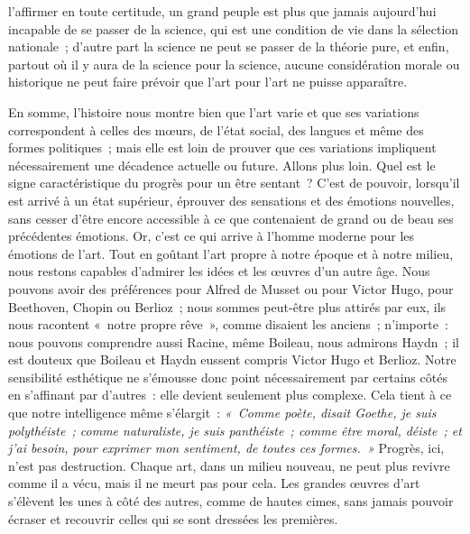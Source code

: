 \documentclass[french,twoside]{book} %
\begin{document}
l’affirmer en toute certitude, un grand peuple est plus que jamais aujourd’hui incapable de se passer de la science, qui est une condition de vie dans la sélection nationale ; d’autre part la science ne peut se passer de la théorie pure, et enfin, partout où il y aura de la science pour la science, aucune considération morale ou historique ne peut faire prévoir que l’art pour l’art ne puisse apparaître.\par
\par
En somme, l’histoire nous montre bien que l’art varie et que ses variations correspondent à celles des mœurs, de l’état social, des langues et même des formes politiques ; mais elle est loin de prouver que ces variations impliquent nécessairement une décadence actuelle ou future. Allons plus loin. Quel est le signe caractéristique du progrès pour un être sentant ? C’est de pouvoir, lorsqu’il est arrivé à un état supérieur, éprouver des sensations et des émotions nouvelles, sans cesser d’être encore accessible à ce que contenaient de grand ou de beau ses précédentes émotions. Or, c’est ce qui arrive à l’homme moderne pour les émotions de l’art. Tout en goûtant l’art propre à notre époque et à notre milieu, nous restons capables d’admirer les idées et les œuvres d’un autre âge. Nous pouvons avoir des préférences pour Alfred de Musset ou pour Victor Hugo, pour Beethoven, Chopin ou Berlioz ; nous sommes peut-être plus attirés par eux, ils nous racontent « notre propre rêve », comme disaient les anciens ; n’importe : nous pouvons comprendre aussi Racine, même Boileau, nous admirons  Haydn ; il est douteux que Boileau et Haydn eussent compris Victor Hugo et Berlioz. Notre sensibilité esthétique ne s’émousse donc point nécessairement par certains côtés en s’affinant par d’autres : elle devient seulement plus complexe. Cela tient à ce que notre intelligence même s’élargit : \emph{« Comme poète, disait Goethe, je suis polythéiste ; comme naturaliste, je suis panthéiste ; comme être moral, déiste ; et j’ai besoin, pour exprimer mon sentiment, de toutes ces formes. »} Progrès, ici, n’est pas destruction. Chaque art, dans un milieu nouveau, ne peut plus revivre comme il a vécu, mais il ne meurt pas pour cela. Les grandes œuvres d’art s’élèvent les unes à côté des autres, comme de hautes cimes, sans jamais pouvoir écraser et recouvrir celles qui se sont dressées les premières.
\end{document}
